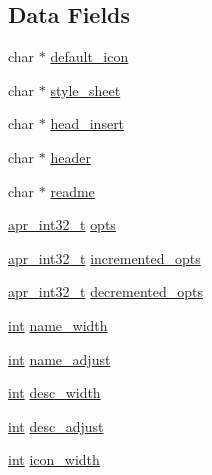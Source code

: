 \subsection*{Data Fields}
\begin{DoxyCompactItemize}
\item 
char $\ast$ \hyperlink{structautoindex__config__struct_a52d633a117f8713bc25e857aadd2c342}{default\+\_\+icon}
\item 
char $\ast$ \hyperlink{structautoindex__config__struct_a6b032865af8223dddc2f32f88d6b9d5c}{style\+\_\+sheet}
\item 
char $\ast$ \hyperlink{structautoindex__config__struct_a16f51bf4ca475e3037a9cc4470bff1db}{head\+\_\+insert}
\item 
char $\ast$ \hyperlink{structautoindex__config__struct_afa1903afbd27603a67c669a5790c4177}{header}
\item 
char $\ast$ \hyperlink{structautoindex__config__struct_ac753678746360f12b0868ca52c46727a}{readme}
\item 
\hyperlink{group__apr__platform_ga21ef1e35fd3ff9be386f3cb20164ff02}{apr\+\_\+int32\+\_\+t} \hyperlink{structautoindex__config__struct_a1d0050b118e98ff9ef17d05939a6fca0}{opts}
\item 
\hyperlink{group__apr__platform_ga21ef1e35fd3ff9be386f3cb20164ff02}{apr\+\_\+int32\+\_\+t} \hyperlink{structautoindex__config__struct_ae3e1894afde8c461928dca0eca83a4ba}{incremented\+\_\+opts}
\item 
\hyperlink{group__apr__platform_ga21ef1e35fd3ff9be386f3cb20164ff02}{apr\+\_\+int32\+\_\+t} \hyperlink{structautoindex__config__struct_ab1b64f2c7fd4615fabca8c5a47417a58}{decremented\+\_\+opts}
\item 
\hyperlink{pcre_8txt_a42dfa4ff673c82d8efe7144098fbc198}{int} \hyperlink{structautoindex__config__struct_af457f5395df11240542c36c92ba8754d}{name\+\_\+width}
\item 
\hyperlink{pcre_8txt_a42dfa4ff673c82d8efe7144098fbc198}{int} \hyperlink{structautoindex__config__struct_aec9297c0921e3b0b2f8cfbf5c0eb97e6}{name\+\_\+adjust}
\item 
\hyperlink{pcre_8txt_a42dfa4ff673c82d8efe7144098fbc198}{int} \hyperlink{structautoindex__config__struct_af0a8b526e92ff9061d5668114e16b6c8}{desc\+\_\+width}
\item 
\hyperlink{pcre_8txt_a42dfa4ff673c82d8efe7144098fbc198}{int} \hyperlink{structautoindex__config__struct_ad2a6e3264a83f15450a0825f2c4646be}{desc\+\_\+adjust}
\item 
\hyperlink{pcre_8txt_a42dfa4ff673c82d8efe7144098fbc198}{int} \hyperlink{structautoindex__config__struct_af7945c117255723322e9969d88d99fb5}{icon\+\_\+width}

\end{DoxyCompactItemize}
